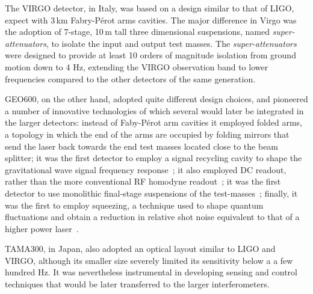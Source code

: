 The VIRGO detector\cite{Accadia_2012}, in Italy, was based on a design similar to that of LIGO, expect with 3\,km Fabry-P\'{e}rot arms cavities. 
The major difference in Virgo was the adoption of 7-stage, 10\,m tall three dimensional suspensions, named \textit{super-attenuators}, to isolate the input and output test masses.
The \textit{super-attenuators} were designed to provide at least 10 orders of magnitude isolation from ground motion down to 4 Hz, extending the VIRGO observation band to lower frequencies compared to the other detectors of the same generation. 


GEO600\cite{L_ck_2006}, on the other hand, adopted quite different design choices, and pioneered a number of innovative technologies of which several would later be integrated in the larger detectors:
instead of Faby-P\'{e}rot arm cavities it employed folded arms, a topology in which the end of the arms are occupied by folding mirrors that send the laser back towards the end test masses located close to the beam splitter;
it was the first detector to employ a signal recycling cavity to shape the gravitational wave signal frequency response~\cite{GEOSRC};
it also employed DC readout, rather than the more conventional RF homodyne readout~\cite{DCreadout};
it was the first detector to use monolithic final-stage suspensions of the test-masses~\cite{GEOsilicafibers};
finally, it was the first to employ squeezing, a technique used to shape quantum fluctuations and obtain a reduction in relative shot noise equivalent to that of a higher power laser~\cite{GEOsqueeze}.


TAMA300\cite{Ando_2002}, in Japan, also adopted an optical layout similar to LIGO and VIRGO, although its smaller size severely limited its sensitivity below a a few hundred Hz.
It was nevertheless instrumental in developing sensing and control techniques that would be later transferred to the larger interferometers.

